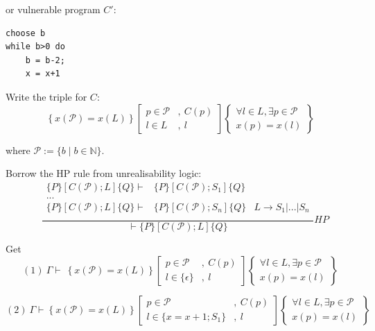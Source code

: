 \documentclass[12pt]{article}
\begin{document}
or vulnerable program $C'$:
\begin{lstlisting}
choose b
while b>0 do
    b = b-2;
    x = x+1
\end{lstlisting}

Write the triple for $C$: 
\[
\left\{ x(\mathcal{P})=x(L) \right\}
\left[
\begin{array}{ll}
p \in \mathcal{P} & , ~C(p) \\
l \in L & , ~l
\end{array}
\right]
\left\{
\begin{array}{c}
\forall l \in L , \exists p \in \mathcal{P} \\
x(p) = x(l)
\end{array}
\right\}
\]

where $\mathcal{P} := \{b \mid b \in \mathbb{N}\}$.

Borrow the HP rule from unrealisability logic:
\[
\quad
\frac{
\begin{array}{ccl}
     \{P\}\left[ C(\mathcal{P});L\right] \{Q\} \vdash & \{P\}\left[ C(\mathcal{P});S_1\right] \{Q\} & \\
     ... \\
     \{P\}\left[ C(\mathcal{P});L\right] \{Q\} \vdash & \{P\}\left[ C(\mathcal{P});S_n\right] \{Q\} & L \rightarrow S_1|...| S_n\\
\end{array}
}
{\vdash \{P\}\left[ C(\mathcal{P});L\right] \{Q\}}
{HP}
\]

Get
\[
(1)~ \Gamma \vdash
\
\left\{ x(\mathcal{P})=x(L) \right\}
\left[
\begin{array}{ll}
p \in \mathcal{P} & , ~C(p) \\
l \in \{\epsilon\} & , ~l
\end{array}
\right]
\left\{
\begin{array}{c}
\forall l \in L , \exists p \in \mathcal{P} \\
x(p) = x(l)
\end{array}
\right\}
\]

\[
(2)~ \Gamma \vdash
\left\{ x(\mathcal{P})=x(L) \right\}
\left[
\begin{array}{ll}
p \in \mathcal{P} & , ~C(p) \\
l \in \{x=x+1;S_1\} & , ~l
\end{array}
\right]
\left\{
\begin{array}{c}
\forall l \in L , \exists p \in \mathcal{P} \\
x(p) = x(l)
\end{array}
\right\}
\]
\end{document}
